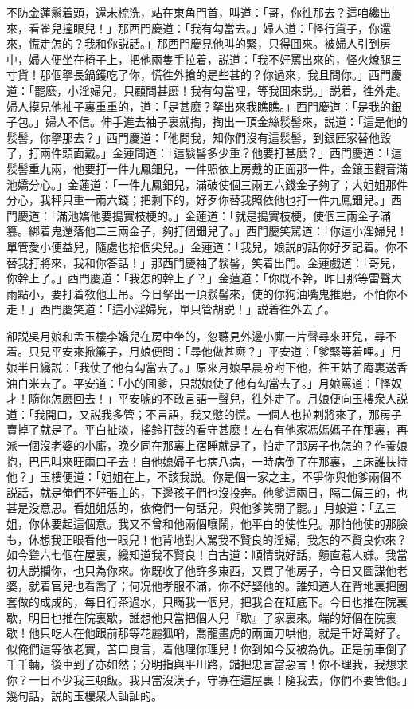 不防金蓮鬅着頭，還未梳洗，站在東角門首，叫道：「哥，你徃那去？這咱纔出來，看雀兒撞眼兒！」那西門慶道：「我有勾當去。」婦人道：「怪行貨子，你還來，慌走怎的？我和你説話。」那西門慶見他叫的緊，只得囬來。被婦人引到房中，婦人便坐在椅子上，把他兩隻手拉着，説道：「我不好罵出來的，怪火燎腿三寸貨！那個拏長鍋鑊吃了你，慌徃外搶的是些甚的？你過來，我且問你。」西門慶道：「罷麽，小淫婦兒，只顧問甚麽！我有勾當哩，等我囬來説。」説着，徃外走。婦人摸見他袖子裏重重的，道：「是甚麽？拏出來我瞧瞧。」西門慶道：「是我的銀子包。」婦人不信。伸手進去袖子裏就掏，掏出一頂金絲䯼髻來，説道：「這是他的䯼髻，你拏那去？」西門慶道：「他問我，知你們沒有這䯼髻，到銀匠家替他毀了，打兩件頭面戴。」金蓮問道：「這䯼髻多少重？他要打甚麽？」西門慶道：「這䯼髻重九兩，他要打一件九鳳鈿兒，一件照依上房戴的正面那一件，金鑲玉觀音滿池嬌分心。」金蓮道：「一件九鳳鈿兒，滿破使個三兩五六錢金子夠了；大姐姐那件分心，我秤只重一兩六錢；把剩下的，好歹你替我照依他也打一件九鳳鈿兒。」西門慶道：「滿池嬌他要搗實枝梗的。」金蓮道：「就是搗實枝梗，使個三兩金子滿篡。綁着鬼還落他二三兩金子，夠打個鈿兒了。」西門慶笑駡道：「你這小淫婦兒！單管愛小便益兒，隨處也掐個尖兒。」金蓮道：「我兒，娘説的話你好歹記着。你不替我打將來，我和你答話！」那西門慶袖了䯼髻，笑着出門。金蓮戲道：「哥兒，你幹上了。」西門慶道：「我怎的幹上了？」金蓮道：「你既不幹，昨日那等雷聲大雨點小，要打着敎他上吊。今日拏出一頂䯼髻來，使的你狗油嘴鬼推磨，不怕你不走！」西門慶笑道：「這小淫婦兒，單只管胡説！」説着徃外去了。

卻説吳月娘和孟玉樓李嬌兒在房中坐的，忽聽見外邊小廝一片聲尋來旺兒，尋不着。只見平安來掀簾子，月娘便問：「尋他做甚麽？」平安道：「爹緊等着哩。」月娘半日纔説：「我使了他有勾當去了。」原來月娘早晨吩咐下他，徃王姑子庵裏送香油白米去了。平安道：「小的囬爹，只説娘使了他有勾當去了。」月娘罵道：「怪奴才！隨你怎麽回去！」平安唬的不敢言語一聲兒，徃外走了。月娘便向玉樓衆人説道：「我開口，又説我多管；不言語，我又憋的慌。一個人也拉剌將來了，那房子賣掉了就是了。平白扯淡，搖鈴打鼓的看守甚麽！左右有他家馮媽媽子在那裏，再派一個沒老婆的小廝，晚夕同在那裏上宿睡就是了，怕走了那房子也怎的？作養娘抱，巴巴叫來旺兩口子去！自他媳婦子七病八病，一時病倒了在那裏，上床誰扶持他？」玉樓便道：「姐姐在上，不該我説。你是個一家之主，不爭你與他爹兩個不説話，就是俺們不好張主的，下邊孩子們也沒投奔。他爹這兩日，隔二偏三的，也甚是没意思。看姐姐恁的，依俺們一句話兒，與他爹笑開了罷。」月娘道：「孟三姐，你休要起這個意。我又不曾和他兩個嚷鬧，他平白的使性兒。那怕他使的那臉も，休想我正眼看他一眼兒！他背地對人駡我不賢良的淫婦，我怎的不賢良你來？如今聳六七個在屋裏，纔知道我不賢良！自古道：順情説好話，戅直惹人嫌。我當初大説攔你，也只為你來。你既收了他許多東西，又買了他房子，今日又圖謀他老婆，就着官兒也看喬了；何况他孝服不滿，你不好娶他的。誰知道人在背地裏把圈套做的成成的，每日行茶過水，只瞞我一個兒，把我合在缸底下。今日也推在院裏歇，明日也推在院裏歇，誰想他只當把個人兒『歇』了家裏來。端的好個在院裏歇！他只吃人在他跟前那等花麗狐哨，喬龍畫虎的兩面刀哄他，就是千好萬好了。似俺們這等依老實，苦口良言，着他理你理兒！你到如今反被為仇。正是前車倒了千千輛，後車到了亦如然；分明指與平川路，錯把忠言當惡言！你不理我，我想求你？一日不少我三頓飯。我只當沒漢子，守寡在這屋裏！隨我去，你們不要管他。」幾句話，説的玉樓衆人訕訕的。

